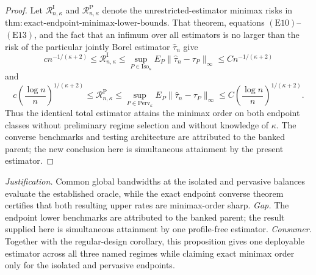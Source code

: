 \documentclass{article}
\begin{document}
\begin{proof}
Let \(\mathcal R^{\mathrm I}_{n,\kappa}\) and
\(\mathcal R^{\mathrm P}_{n,\kappa}\) denote the unrestricted-estimator minimax risks in
\(\mathrm{thm{:}exact\text{-}endpoint\text{-}minimax\text{-}lower\text{-}bounds}\).  That theorem, equations \((\mathrm{E10})\)--\((\mathrm{E13})\), and the fact that an infimum over all estimators is no larger than the risk of the particular jointly Borel estimator \(\widehat\tau_n\) give
\[
 c n^{-1/(\kappa+2)}
 \leq\mathcal R^{\mathrm I}_{n,\kappa}
 \leq\sup_{P\in\mathrm{Iso}_\kappa}
 E_P\|\widehat\tau_n-\tau_P\|_\infty
 \leq C n^{-1/(\kappa+2)}
 \tag{E14}
\]
and
\[
 c\left(\frac{\log n}{n}\right)^{1/(\kappa+2)}
 \leq\mathcal R^{\mathrm P}_{n,\kappa}
 \leq\sup_{P\in\mathrm{Perv}_\kappa}
 E_P\|\widehat\tau_n-\tau_P\|_\infty
 \leq C\left(\frac{\log n}{n}\right)^{1/(\kappa+2)}.
 \tag{E15}
\]
Thus the identical total estimator attains the minimax order on both endpoint classes without preliminary regime selection and without knowledge of \(\kappa\).  The converse benchmarks and testing architecture are attributed to the banked parent; the new conclusion here is simultaneous attainment by the present estimator.
\end{proof}
\par\smallskip\noindent \textit{Justification.} Common global bandwidths at the isolated and pervasive balances evaluate the established oracle, while the exact endpoint converse theorem certifies that both resulting upper rates are minimax-order sharp. \textit{Gap.} The endpoint lower benchmarks are attributed to the banked parent; the result supplied here is simultaneous attainment by one profile-free estimator. \textit{Consumer.} Together with the regular-design corollary, this proposition gives one deployable estimator across all three named regimes while claiming exact minimax order only for the isolated and pervasive endpoints.
\end{document}
